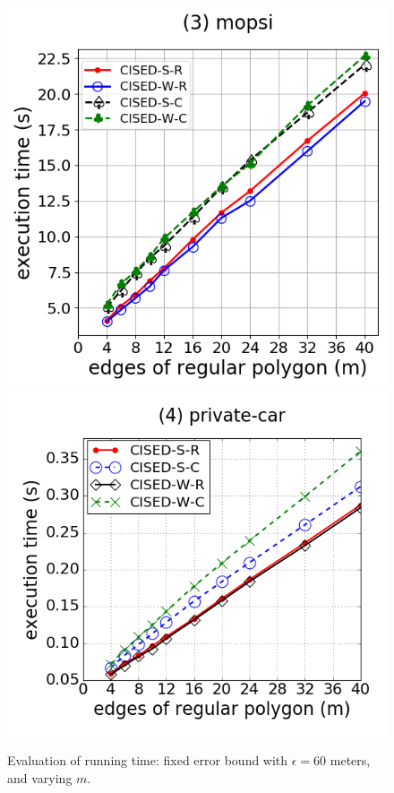 \begin{figure}[tb!]
\includegraphics[scale = 0.240]{Figures/Exp-M-e-60-time-mopsi.png}
\includegraphics[scale = 0.240]{Figures/Exp-M-e-60-time-private.png}
\vspace{-1ex}
\caption{\small Evaluation of running time: fixed error bound with $\epsilon=60$ meters, and varying $m$. }
\label{fig:m-time-e60}
\vspace{-1ex}
\end{figure}




